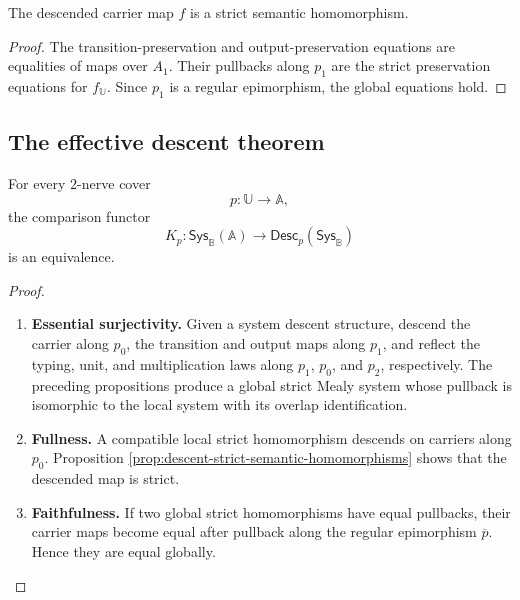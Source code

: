 \begin{proposition}
\label{prop:descent-strict-semantic-homomorphisms}
The descended carrier map \(f\) is a strict semantic homomorphism.
\end{proposition}

\begin{proof}
The transition-preservation and output-preservation equations are equalities
of maps over \(A_1\). Their pullbacks along \(p_1\) are the strict
preservation equations for \(f_{\mathbb U}\). Since \(p_1\) is a regular
epimorphism, the global equations hold.
\end{proof}

\subsection{The effective descent theorem}
\label{subsec:effective-descent-theorem-strict-systems}

\begin{theorem}
\label{thm:effective-descent-strict-mealy-systems}
For every \(2\)-nerve cover
\[
    p:\mathbb U\to\mathbb A,
\]
the comparison functor
\[
    K_p:
    \mathsf{Sys}_{\mathbb B}(\mathbb A)
    \longrightarrow
    \mathsf{Desc}_p
    \left(
        \mathsf{Sys}_{\mathbb B}
    \right)
\]
is an equivalence.
\end{theorem}

\begin{proof}
\leavevmode
\begin{enumerate}
    \item \textbf{Essential surjectivity.}
    Given a system descent structure, descend the carrier along \(p_0\), the
    transition and output maps along \(p_1\), and reflect the typing, unit, and
    multiplication laws along \(p_1\), \(p_0\), and \(p_2\), respectively.
    The preceding propositions produce a global strict Mealy system whose
    pullback is isomorphic to the local system with its overlap
    identification.

    \item \textbf{Fullness.}
    A compatible local strict homomorphism descends on carriers along \(p_0\).
    Proposition
    \ref{prop:descent-strict-semantic-homomorphisms}
    shows that the descended map is strict.

    \item \textbf{Faithfulness.}
    If two global strict homomorphisms have equal pullbacks, their carrier maps
    become equal after pullback along the regular epimorphism
    \(\overline p\). Hence they are equal globally.
\end{enumerate}
\end{proof}

